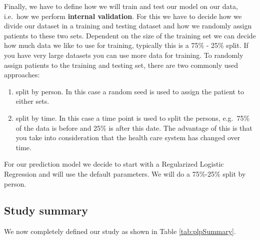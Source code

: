 \documentclass[11pt]{book}
\providecommand{\tightlist}{%
  \setlength{\itemsep}{0pt}\setlength{\parskip}{0pt}}
\theoremstyle{definition}
\theoremstyle{definition}
\theoremstyle{definition}
\theoremstyle{remark}
\begin{document}
Finally, we have to define how we will train and test our model on our data, i.e.~how we perform \textbf{internal validation}. For this we have to decide how we divide our dataset in a training and testing dataset and how we randomly assign patients to these two sets. Dependent on the size of the training set we can decide how much data we like to use for training, typically this is a 75\% - 25\% split. If you have very large datasets you can use more data for training. To randomly assign patients to the training and testing set, there are two commonly used approaches:

\begin{enumerate}
\def\labelenumi{\arabic{enumi}.}
\tightlist
\item
  split by person. In this case a random seed is used to assign the patient to either sets.
\item
  split by time. In this case a time point is used to split the persons, e.g.~75\% of the data is before and 25\% is after this date. The advantage of this is that you take into consideration that the health care system has changed over time.
\end{enumerate}

For our prediction model we decide to start with a Regularized Logistic Regression and will use the default parameters. We will do a 75\%-25\% split by person.

\hypertarget{study-summary-1}{%
\subsection{Study summary}\label{study-summary-1}}

We now completely defined our study as shown in Table \ref{tab:plpSummary}.
\end{document}
